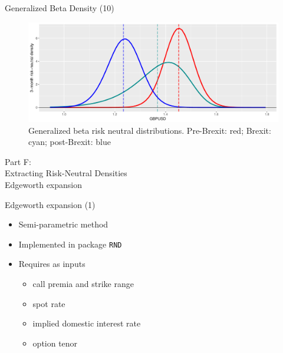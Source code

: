 \begin{frame}{Generalized Beta Density (10)}

\begin{figure}
\includegraphics[width=1\linewidth]{2018_02_07_IMF_FXCourse_files/figure-beamer/unnamed-chunk-58-1} \caption{Generalized beta risk neutral distributions. Pre-Brexit: red; Brexit: cyan; post-Brexit: blue}\label{fig:unnamed-chunk-58}
\end{figure}

\end{frame}

\begin{frame}{}

\color{blue} \LARGE{Part F:}\\
\LARGE{Extracting Risk-Neutral Densities}\\
\Large{Edgeworth expansion}

\end{frame}

\begin{frame}[fragile]{Edgeworth expansion (1)}

\begin{itemize}
\tightlist
\item
  Semi-parametric method
\item
  Implemented in package \texttt{RND}
\item
  Requires as inputs

  \begin{itemize}
  \tightlist
  \item
    call premia and strike range
  \item
    spot rate
  \item
    implied domestic interest rate
  \item
    option tenor
  \end{itemize}
\end{itemize}

\end{frame}

